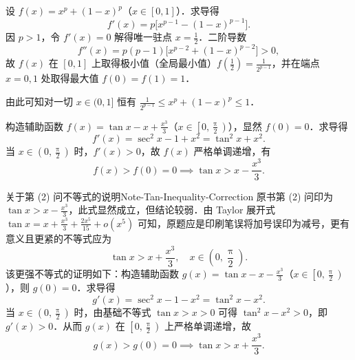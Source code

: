 \begin{myproof}

    设 $f(x) = x^p + (1-x)^p$（$x \in [0, 1]$）．求导得
    \begin{equation}
        f'(x) = p\bigl[ x^{p-1} - (1-x)^{p-1} \bigr].
    \end{equation}
    因 $p > 1$，令 $f'(x) = 0$ 解得唯一驻点 $x = \frac{1}{2}$．二阶导数
    \begin{equation}
        f''(x) = p(p-1)\bigl[ x^{p-2} + (1-x)^{p-2} \bigr] > 0,
    \end{equation}
    故 $f(x)$ 在 $[0, 1]$ 上取得极小值（全局最小值）$f\left(\frac{1}{2}\right) = \frac{1}{2^{p-1}}$，并在端点 $x = 0, 1$ 处取得最大值 $f(0) = f(1) = 1$．

    由此可知对一切 $x \in (0, 1]$ 恒有 $\frac{1}{2^{p-1}} \leqslant x^p + (1-x)^p \leqslant 1$．


    构造辅助函数 $f(x) = \tan x - x + \frac{x^3}{3}$（$x \in \left[0, \frac{\uppi}{2}\right)$），显然 $f(0) = 0$．求导得
    \begin{equation}
        f'(x) = \sec^2 x - 1 + x^2 = \tan^2 x + x^2.
    \end{equation}
    当 $x \in \left(0, \frac{\uppi}{2}\right)$ 时，$f'(x) > 0$，故 $f(x)$ 严格单调递增，有
    \begin{equation}
        f(x) > f(0) = 0 \implies \tan x > x - \frac{x^3}{3}.
    \end{equation}

    \begin{note}{关于第 (2) 问不等式的说明}{Note-Tan-Inequality-Correction}
        原书第 (2) 问印为 $\tan x > x - \frac{x^3}{3}$，此式显然成立，但结论较弱．由 Taylor 展开式 $\tan x = x + \frac{x^3}{3} + \frac{2x^5}{15} + o(x^5)$ 可知，原题应是印刷笔误将加号误印为减号，更有意义且更紧的不等式应为
        \begin{equation}
            \tan x > x + \frac{x^3}{3}, \quad x \in \left(0, \frac{\uppi}{2}\right).
        \end{equation}
        该更强不等式的证明如下：构造辅助函数 $g(x) = \tan x - x - \frac{x^3}{3}$（$x \in \left[0, \frac{\uppi}{2}\right)$），则 $g(0) = 0$．求导得
        \begin{equation}
            g'(x) = \sec^2 x - 1 - x^2 = \tan^2 x - x^2.
        \end{equation}
        当 $x \in \left(0, \frac{\uppi}{2}\right)$ 时，由基础不等式 $\tan x > x > 0$ 可得 $\tan^2 x - x^2 > 0$，即 $g'(x) > 0$．从而 $g(x)$ 在 $\left[0, \frac{\uppi}{2}\right)$ 上严格单调递增，故
        \begin{equation}
            g(x) > g(0) = 0 \implies \tan x > x + \frac{x^3}{3}.
        \end{equation}
    \end{note}


\end{myproof}
